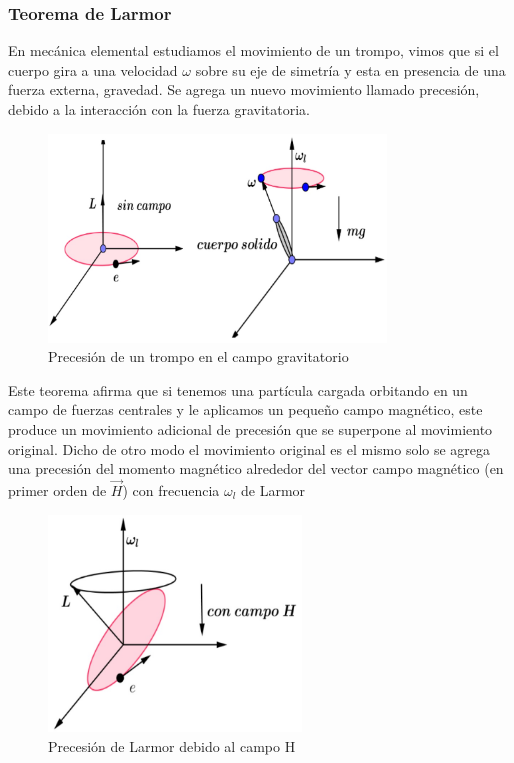 \subsubsection{Teorema de Larmor}
En mecánica elemental estudiamos el movimiento de un trompo, vimos que si el cuerpo gira a una velocidad $\omega$ sobre su eje de simetría y esta en presencia de una fuerza externa, gravedad. Se agrega un nuevo movimiento llamado precesión, debido a la interacción con la fuerza gravitatoria.

\begin{figure}[H]
    \centering
    \includegraphics[width=0.8\textwidth]{./Figures/Larmor1}
	\caption{Precesión de un trompo en el campo gravitatorio}
	\label{fig:Larmor1}
\end{figure}

Este teorema afirma que si tenemos una partícula cargada orbitando en un campo de fuerzas centrales y le aplicamos un pequeño campo magnético, este produce un movimiento adicional de precesión que se superpone al movimiento original. Dicho de otro modo el movimiento original es el mismo solo se agrega una precesión del momento magnético alrededor del vector campo magnético (en primer orden de $\overrightarrow{H}$) con frecuencia $\omega_{l}$ de Larmor

\begin{figure}[H]
    \centering
    \includegraphics[width=0.6\textwidth]{./Figures/Larmor2}
	\caption{Precesión de Larmor debido al campo H}
	\label{fig:Larmor2}
\end{figure}



